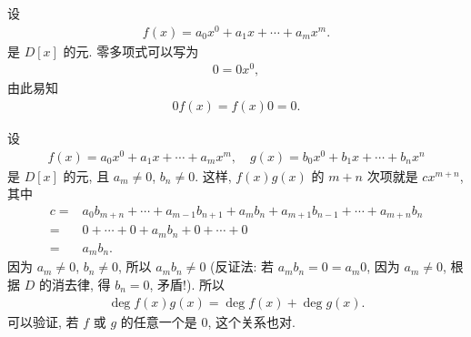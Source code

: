 \begin{example}
    设
    \begin{align*}
        f(x) = a_0 x^0 + a_1 x + \cdots + a_m x^m.
    \end{align*}
    是 $D[x]$ 的元. 零多项式可以写为
    \begin{align*}
        0 = 0x^0,
    \end{align*}
    由此易知
    \begin{align*}
        0f(x) = f(x)0 = 0.
    \end{align*}
\end{example}

\begin{remark}
    设
    \begin{align*}
        f(x) = a_0 x^0 + a_1 x + \cdots + a_m x^m, \quad g(x) = b_0 x^0 + b_1 x + \cdots + b_n x^n
    \end{align*}
    是 $D[x]$ 的元, 且 $a_m \neq 0$, $b_n \neq 0$. 这样, $f(x)g(x)$ 的 $m+n$ 次项就是 $cx^{m+n}$, 其中
    \begin{align*}
        c
        = {} & a_0 b_{m+n} + \cdots + a_{m-1} b_{n+1} + a_m b_n + a_{m+1} b_{n-1} + \cdots + a_{m+n}b_n \\
        = {} & 0 + \cdots + 0 + a_m b_n + 0 + \cdots + 0                                                \\
        = {} & a_m b_n.
    \end{align*}
    因为 $a_m \neq 0$, $b_n \neq 0$, 所以 $a_m b_n \neq 0$ (反证法: 若 $a_m b_n = 0 = a_m 0$, 因为 $a_m \neq 0$, 根据 $D$ 的消去律, 得 $b_n = 0$, 矛盾!). 所以
    \begin{align*}
        \deg f(x) g(x) = \deg f(x) + \deg g(x).
    \end{align*}
    可以验证, 若 $f$ 或 $g$ 的任意一个是 $0$, 这个关系也对.
\end{remark}

